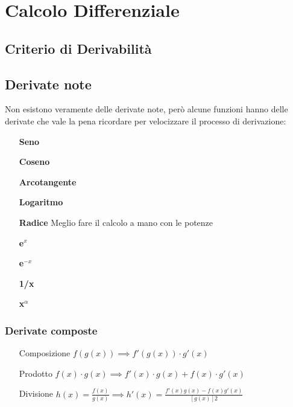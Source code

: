 \documentclass[12pt, a4paper, openany]{book}
\begin{document}
\chapter{Calcolo Differenziale}
\section{Criterio di Derivabilità}
\section{Derivate note}
Non esistono veramente delle derivate note, però alcune funzioni hanno delle derivate che vale la pena ricordare per velocizzare il processo di derivazione:
\begin{itemize}
	\item[\textbf{Seno}] 
	\item[\textbf{Coseno}] 
	\item[\textbf{Arcotangente}] 
	\item[\textbf{Logaritmo}] 
	\item[\textbf{Radice}] Meglio fare il calcolo a mano con le potenze%
	\item[\textbf{e$^x$}] 
	\item[\textbf{e$^{-x}$}] 
	\item[\textbf{1/x}] 
	\item[\textbf{x$^\alpha$}] 
\end{itemize}
\subsection*{Derivate composte}
\begin{itemize}
	\item[Composizione] $f(g(x)) \implies f'(g(x)) \cdot g'(x)$
	\item[Prodotto] $f(x) \cdot g(x) \implies f'(x) \cdot g(x) + f(x) \cdot g'(x)$
	\item[Divisione] $h(x)=\frac{f(x)}{g(x)} \implies h'(x) = \frac{f'(x)g(x) - f(x)g'(x)}{[g(x)]2}$
\end{itemize}
\end{document}
